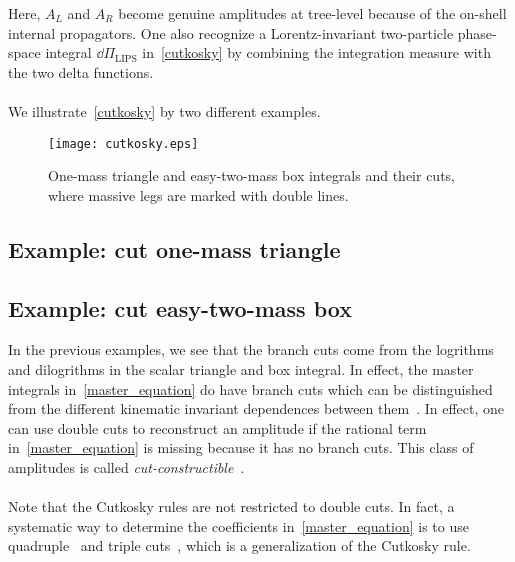 Here, $A_L$ and $A_R$ become genuine amplitudes at tree-level because of the on-shell internal propagators. 
One also recognize a Lorentz-invariant two-particle phase-space integral $\dd\Pi_{\mathrm{LIPS}}$ in~\cref{cutkosky} by combining the integration measure with the two delta functions.
\\\\
We illustrate~\cref{cutkosky} by two different examples.
%
%
\begin{figure}[h]
  \centering
  \texttt{[image: cutkosky.eps]}
  \caption{One-mass triangle and easy-two-mass box integrals and their cuts, where massive legs are marked with double lines.}
  \label{fig-cutkosky}
\end{figure}
\subsection*{Example: cut one-mass triangle}

\subsection*{Example: cut easy-two-mass box}


%
In the previous examples, we see that the branch cuts come from the logrithms and dilogrithms in the scalar triangle and box integral. 
In effect, the master integrals in~\cref{master_equation} do have branch cuts which can be distinguished from the different kinematic invariant dependences between them~\cite{Bern:1993kr}.
In effect, one can use double cuts to reconstruct an amplitude if the rational term in~\cref{master_equation} is missing because it has no branch cuts.
This class of amplitudes is called \textit{cut-constructible}~\cite{Bern:1994cg}. 
\\\\
Note that the Cutkosky rules are not restricted to double cuts. 
In fact, a systematic way to determine the coefficients in~\cref{master_equation} is to use quadruple~\cite{BRITTO2005499} and triple cuts~\cite{Forde:2007mi}, which is a generalization of the Cutkosky rule.